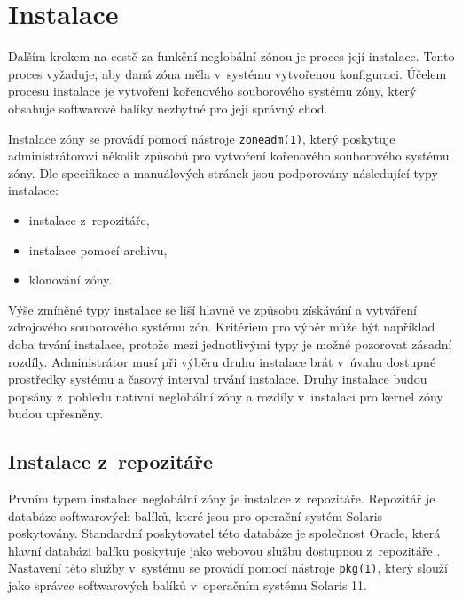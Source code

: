 \section{Instalace}
\label{chapter:zones:instalation}
Dalším krokem na cestě za funkční neglobální zónou je proces její instalace. Tento proces vyžaduje, aby daná zóna měla
v~systému vytvořenou konfiguraci. Účelem procesu instalace je vytvoření kořenového souborového systému zóny, který obsahuje
softwarové balíky nezbytné pro její správný chod.

Instalace zóny se provádí pomocí nástroje \verb|zoneadm(1)|, který poskytuje administrátorovi několik způsobů
pro vytvoření kořenového souborového systému zóny. Dle specifikace \cite{oracle:solaris:zones:installation} a manuálových stránek
\cite{oracle:manpages:zoneadm} jsou podporovány následující typy instalace:
\begin{itemize}
 \item instalace z~repozitáře,
 \item instalace pomocí archivu,
 \item klonování zóny.
\end{itemize}
Výše zmíněné typy instalace se liší hlavně ve způsobu získávání a vytváření zdrojového souborového systému zón. Kritériem pro
výběr může být například doba trvání instalace, protože mezi jednotlivými typy je možné pozorovat zásadní rozdíly. Administrátor
musí při výběru druhu instalace brát v~úvahu dostupné prostředky systému a časový interval trvání instalace. Druhy instalace
budou popsány z~pohledu nativní neglobální zóny a rozdíly v~instalaci pro kernel zóny budou upřesněny. 
\subsection{Instalace z~repozitáře}
\label{chapter:zones:instalation:repozitory}
Prvním typem instalace neglobální zóny je instalace z~repozitáře. Repozitář je databáze softwarových balíků, které jsou pro 
operační systém Solaris poskytovány. Standardní poskytovatel této databáze je společnost Oracle, která hlavní databázi balíku
poskytuje jako webovou službu dostupnou z~repozitáře \cite{oracle:solaris:desing:pkg_repository}. Nastavení této služby v~systému
se provádí pomocí nástroje \verb|pkg(1)|, který slouží jako správce softwarových balíků v~operačním systému Solaris 11.

